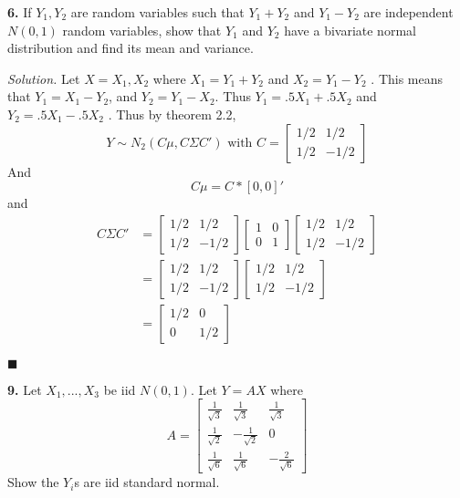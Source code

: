 \documentclass{article}
\begin{document}
\newpage
\textbf{6.} If \(Y_1, Y_2\) are random variables such that \(Y_1+Y_2\) and \(Y_1-Y_2\) are independent \(N(0,1)\) random variables, show that \(Y_1\) and \( Y_2\) have a bivariate normal distribution and find its mean and variance. 


\vspace{4mm}
\textit{Solution. } Let \(X = X_1, X_2\) where \(X_1 = Y_1+Y_2\) and \(X_2=Y_1 - Y_2\) . This means that \(Y_1 = X_1 -Y_2\), and \(Y_2 = Y_1-X_2\). Thus \(Y_1 = .5X_1 + .5X_2\) and \(Y_2 = .5X_1 -.5X_2\) . Thus by theorem 2.2, 
\[
 Y \sim N_2(C\mu, C\Sigma C')  \text{ with }C=\begin{bmatrix}
 1/2 & 1/2\\
 1/2 & -1/2
 \end{bmatrix}
\]
And 
\[
C\mu = C * [0,0]'
\]
and
\begin{align*}
C\Sigma C' &= \begin{bmatrix}
 1/2 & 1/2\\
 1/2 & -1/2
 \end{bmatrix}
 \begin{bmatrix}
 1 & 0\\
 0& 1
 \end{bmatrix}
 \begin{bmatrix}
 1/2 & 1/2\\
 1/2 & -1/2
 \end{bmatrix} \\
 &= 
 \begin{bmatrix}
 1/2 & 1/2\\
 1/2 & -1/2
 \end{bmatrix}
 \begin{bmatrix}
 1/2 & 1/2\\
 1/2 & -1/2
 \end{bmatrix} \\
 &= \begin{bmatrix}
 1/2 & 0\\
 0 & 1/2 
 \end{bmatrix}
\end{align*}


\begin{flushright}
\(\blacksquare\)
\end{flushright} 

\newpage
\textbf{9. } Let \(X_1,..., X_3\) be iid \(N(0,1)\). Let \(Y = AX\) where \[
A= \begin{bmatrix}
\frac1{\sqrt{3 }} & \frac1{\sqrt{ 3}}&\frac1{\sqrt{ 3} }\\
\frac1{\sqrt{ 2}}&-\frac1{\sqrt{ 2}} &0\\
\frac1{\sqrt{ 6} }& \frac1{\sqrt{ 6}}   &-\frac2{\sqrt{ 6} }
\end{bmatrix}
\] Show the \(Y_i\)s are iid standard normal. 
\end{document}
